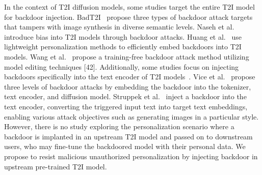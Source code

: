 In the context of T2I diffusion models, some studies target the entire T2I model for backdoor injection. BadT2I~\cite{zhai2023text} propose three types of backdoor attack targets that tampers with image synthesis in diverse semantic levels. Naseh et al.~\cite{naseh2024injecting} introduce bias into T2I models through backdoor attacks. Huang et al.~\cite{huang2024personalization} use lightweight personalization methods to efficiently embed backdoors into T2I models. Wang et al.~\cite{wang2024eviledit} propose a training-free backdoor attack method utilizing model editing techniques [42]. Additionally, some studies focus on injecting backdoors specifically into the text encoder of T2I models~\cite{struppek2023rickrolling,vice2024bagm}. Vice et al.~\cite{struppek2023rickrolling} propose three levels of backdoor attacks by embedding the backdoor into the tokenizer, text encoder, and diffusion model. Struppek et al.~\cite{vice2024bagm} inject a backdoor into the text encoder, converting the triggered input text into target text embeddings, enabling various attack objectives such as generating images in a particular style. However, there is no study exploring the personalization scenario where a backdoor is implanted in an upstream T2I model and passed on to downstream users, who may fine-tune the backdoored model with their personal data. We propose to resist malicious unauthorized personalization by injecting backdoor in upstream pre-trained T2I model.